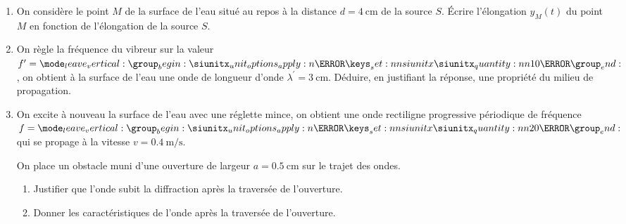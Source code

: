 \begin{enumerate}
    \item On considère le point $M$ de la surface de l'eau situé au repos à la
          distance $d=\qty{4}{\cm}$ de la source $S$. Écrire l'élongation
          $y_{M}(t)$ du point $M$ en fonction de l'élongation de la source $S$.
  
    \item On règle la fréquence du vibreur sur la valeur
          $\freq^{\prime}=\qty{10}{\Hz}$, on obtient à la surface de l'eau une onde
          de longueur d'onde $\lambda^{\prime}=\qty{3}{\cm}$. Déduire, en
          justifiant la réponse, une propriété du milieu de propagation.
    \item On excite à nouveau la surface de l'eau avec une réglette mince, on
          obtient une onde rectiligne progressive périodique de fréquence
          $\freq=\qty{20}{\Hz}$ qui se propage à la vitesse
          $v=\qty{0.4}{\m\per\s}$.

          On place un obstacle muni d'une ouverture de largeur
          $a=\qty{0.5}{\cm}$ sur le trajet des ondes.
          \begin{enumerate}
              \item Justifier que l'onde subit la diffraction après la traversée
                    de l'ouverture.
              \item Donner les caractéristiques de l'onde après la traversée de
                    l'ouverture.
          \end{enumerate}
\end{enumerate}

